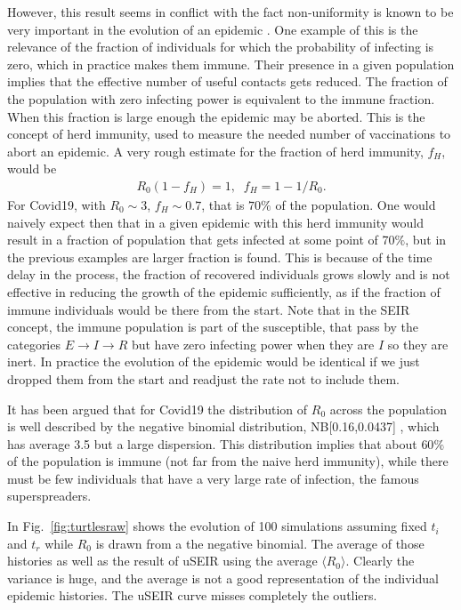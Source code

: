 \documentclass[a4paper,oneside,11pt]{article}
\begin{document}
 However, this result seems in conflict with the fact non-uniformity is known to be very important in the evolution of an epidemic \cite{}. One example of this is the relevance of the fraction of individuals for which the probability of infecting is zero, which in practice makes them immune. Their presence in a given population implies that the effective number of useful contacts gets reduced. The fraction of the population with zero infecting power is equivalent to the immune fraction. When this fraction is large enough  the epidemic may be aborted. This is the concept of herd immunity, used to measure the needed number of vaccinations to abort an epidemic. A very rough estimate for the fraction of herd immunity, $f_H$, would be
   \begin{eqnarray}
  R_0 (1- f_H)  =1, \;\; f_H= 1-1/R_0.
   \end{eqnarray}
   For Covid19, with $R_0 \sim 3$, $f_H \sim 0.7$, that is $70\%$ of the population. One would naively expect then that in a given epidemic with this herd immunity would result in a fraction of  population that gets infected at some point of 70$\%$, but in the previous examples are larger fraction is found. This is because of the time delay in the process, the fraction of recovered individuals grows slowly and is not effective in reducing the growth of the epidemic sufficiently, as if the fraction of immune individuals would be there from the start. Note that in the SEIR concept, the immune population is part of the susceptible, that pass by the categories $E\rightarrow I \rightarrow R$ but have zero infecting power when they are $I$ so they are inert. In practice the evolution of the epidemic would be identical if we just dropped them from the start and readjust the rate not to include them. 
 
  It has been argued that for Covid19 the distribution of $R_0$ across the population is well described by the negative binomial distribution, NB[0.16,0.0437] \cite{LloydSmithNovember2020}, which has average 3.5 but a large dispersion. This distribution implies that about $60\%$ of the population is immune  (not far from the naive herd immunity), while there must be few individuals that have a very large rate of infection, the famous superspreaders.

  In Fig.~\ref{fig:turtlesraw} shows the evolution of 100 simulations assuming fixed $t_i$ and $t_r$ while $R_0$ is drawn from a the negative binomial. The average of those histories as well as the result of
  uSEIR using the average $\langle R_0\rangle$. Clearly the variance is huge, and the average is not a good representation of the individual epidemic histories. The uSEIR curve misses completely the outliers.
\end{document}
